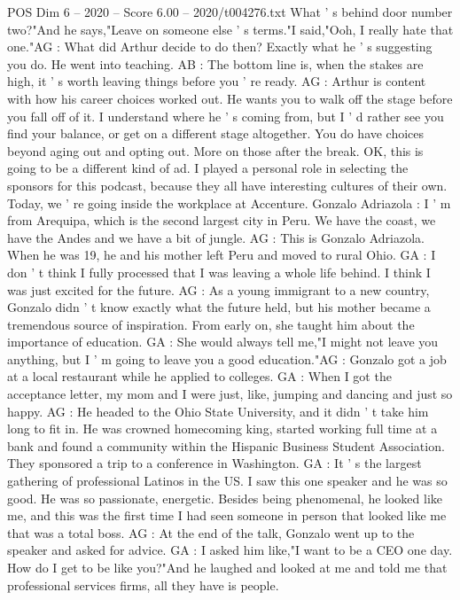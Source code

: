 \begin{textsample}{POS Dim 6 – 2020 – Score 6.00 – 2020/t004276.txt}
What ' s behind door number two?"And he says,"Leave on someone else ' s terms."I said,"Ooh, I really hate that one."AG : What did Arthur decide to do then?
Exactly what he ' s suggesting you do.
He went into teaching.
AB : The bottom line is, when the stakes are high, it ' s worth leaving things before you ' re ready.
AG : Arthur is content with how his career choices worked out.
He wants you to walk off the stage before you fall off of it.
I understand where he ' s coming from, but I ' d rather see you find your balance, or get on a different stage altogether.
You do have choices beyond aging out and opting out.
More on those after the break.
OK, this is going to be a different kind of ad.
I played a personal role in selecting the sponsors for this podcast, because they all have interesting cultures of their own.
Today, we ' re going inside the workplace at Accenture.
Gonzalo Adriazola : I ' m from Arequipa, which is the second largest city in Peru.
We have the coast, we have the Andes and we have a bit of jungle.
AG : This is Gonzalo Adriazola.
When he was 19, he and his mother left Peru and moved to rural Ohio.
GA : I don ' t think I fully processed that I was leaving a whole life behind.
I think I was just excited for the future.
AG : As a young immigrant to a new country, Gonzalo didn ' t know exactly what the future held, but his mother became a tremendous source of inspiration.
From early on, she taught him about the importance of education.
GA : She would always tell me,"I might not leave you anything, but I ' m going to leave you a good education."AG : Gonzalo got a job at a local restaurant while he applied to colleges.
GA : When I got the acceptance letter, my mom and I were just, like, jumping and dancing and just so happy.
AG : He headed to the Ohio State University, and it didn ' t take him long to fit in.
He was crowned homecoming king, started working full time at a bank and found a community within the Hispanic Business Student Association.
They sponsored a trip to a conference in Washington.
GA : It ' s the largest gathering of professional Latinos in the US.
I saw this one speaker and he was so good.
He was so passionate, energetic.
Besides being phenomenal, he looked like me, and this was the first time I had seen someone in person that looked like me that was a total boss.
AG : At the end of the talk, Gonzalo went up to the speaker and asked for advice.
GA : I asked him like,"I want to be a CEO one day.
How do I get to be like you?"And he laughed and looked at me and told me that professional services firms, all they have is people.

\end{textsample}
